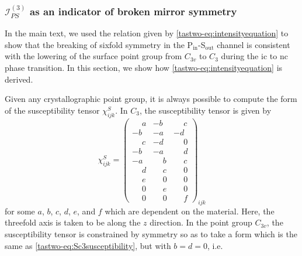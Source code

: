 \subsubsection{$\mathscr{I}_{PS}^{(3)}$ as an indicator of broken mirror symmetry\label{tastwo-sec:Sbmsindicator}}

In the main text, we used the relation given by \cref{tastwo-eq:intensityequation} to show that the breaking of sixfold symmetry in the P$_\mathrm{in}$-S$_\mathrm{out}$ channel is consistent with the lowering of the surface point group from $C_{3v}$ to $C_3$ during the \gls{ic} to \gls{nc} phase transition.
In this section, we show how \cref{tastwo-eq:intensityequation} is derived.

Given any crystallographic point group, it is always possible to compute the form of the susceptibility tensor $\chi^S_{ijk}$.
In $C_3$, the susceptibility tensor is given by~\citep{boyd}
\begin{equation}
\label{tastwo-eq:Sc3susceptibility}
\chi^S_{ijk} = \begin{pmatrix}
\phantom{-}a & -b & \phantom{-}c\\
-b & -a & -d\\
\phantom{-}c & -d & \phantom{-}0\\
\hline
-b & -a & \phantom{-}d\\
-a & \phantom{-}b & \phantom{-}c\\
\phantom{-}d & \phantom{-}c & \phantom{-}0\\
\hline
\phantom{-}e & \phantom{-}0 & \phantom{-}0\\
\phantom{-}0 & \phantom{-}e & \phantom{-}0\\
\phantom{-}0 & \phantom{-}0 & \phantom{-}f
\end{pmatrix}_{ijk}
\end{equation}
for some $a$, $b$, $c$, $d$, $e$, and $f$ which are dependent on the material.
Here, the threefold axis is taken to be along the $z$ direction.
In the point group $C_{3v}$, the susceptibility tensor is constrained by symmetry so as to take a form which is the same as \cref{tastwo-eq:Sc3susceptibility}, but with $b = d = 0$, i.e.

